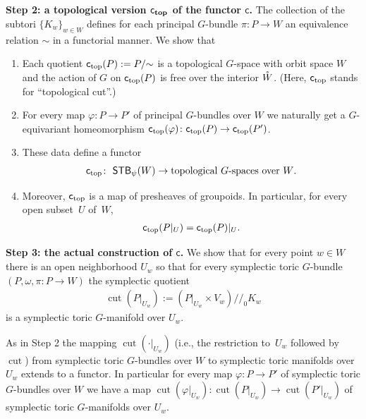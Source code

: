 \documentclass[pdftex]{sigma}
\numberwithin{equation}{section}
\begin{document}
  {\bf Step 2: a topological version $\boldsymbol{{\textsf{c}_{\rm top}}}$ of the
  functor $\boldsymbol{{\textsf{c}}}$.} The collection of the subtori $\{K_w\}_{w\in
  W}$ def\/ines for each principal $G$-bundle $\pi\colon P\to W$ an
equivalence relation $\sim$ in a functorial manner.  We show that
\begin{enumerate}\itemsep=0pt
\item Each quotient ${\textsf{c}_{\rm top}} (P):= P/{\sim}$ is a topological $G$-space
with orbit space $W$ and the action of $G$ on ${\textsf{c}_{\rm top}}(P)$
is free over the interior ${\mathaccent23{W}}$.
(Here, ${\textsf{c}_{\rm top}}$ stands for ``topological cut''.)
\item For every map $\varphi\colon P\to P'$ of principal $G$-bundles over
  $W$ we naturally get a $G$-equivariant homeomorphism
  ${\textsf{c}_{\rm top}}(\varphi)\colon {\textsf{c}_{\rm top}}(P)\to {\textsf{c}_{\rm top}}(P')$.
\item These data def\/ine a functor
\begin{gather*}
{\textsf{c}_{\rm top}}\colon \  {\textsf{STB}}_\psi (W)\to \text{topological $G$-spaces over $W$}.
\end{gather*}
\item Moreover, ${\textsf{c}_{\rm top}}$  is a map of presheaves of groupoids.
      In particular, for every open subset~$U$ of~$W$,
\begin{gather*}
{\textsf{c}_{\rm top}}(P|_U)= {\textsf{c}_{\rm top}}(P)|_U.
\end{gather*}
\end{enumerate}

{\bf Step 3: the actual construction of $\boldsymbol{{\textsf{c}}}$.} We
show that for every point $w\in W$ there is an open neighborhood
$U_w$ so that for every symplectic toric $G$-bundle $(P,\omega, \pi\colon P\to
W)$ the symplectic quotient
\begin{gather*}
\operatorname{cut}(P|_{U_w}):= (P|_{U_w} \times V_w)/\!/_0  K_w
\end{gather*}
is a symplectic toric $G$-manifold over $U_w$.

As in Step 2 the mapping $\operatorname{cut} ({\cdot}|_{U_w})$ (i.e.,
the restriction to~$U_w$ followed by $\operatorname{cut}$) from symplectic toric
$G$-bundles over $W$ to symplectic toric manifolds over $U_w$ extends
to a functor. In particular for every map $\varphi\colon P\to P'$ of
symplectic toric $G$-bundles over $W$ we have a map $\operatorname{cut}
(\varphi|_{U_w})\colon  \operatorname{cut}(P|_{U_w})\to \operatorname{cut}(P'|_{U_w})$ of
symplectic toric $G$-manifolds over $U_w$.
\end{document}
